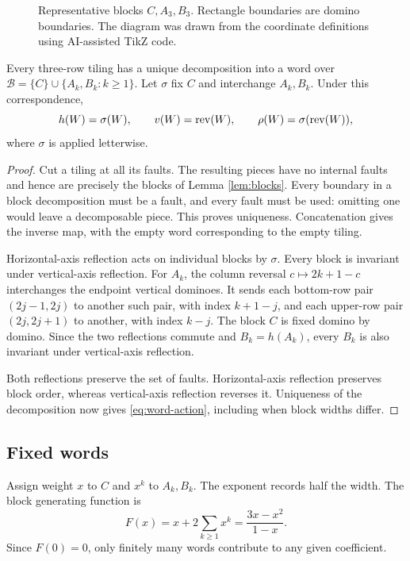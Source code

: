 \begin{figure}[htbp]
\centering

\caption{Representative blocks $C,A_3,B_3$. Rectangle boundaries
are domino boundaries. The diagram was drawn from the coordinate
definitions using AI-assisted TikZ code.}\label{fig:blocks}
\end{figure}

\begin{lemma}\label{lem:word}
Every three-row tiling has a unique decomposition into a word
over $\mathcal B=\{C\}\cup\{A_k,B_k:k\ge1\}$.
Let $\sigma$ fix $C$ and interchange $A_k,B_k$.
Under this correspondence,
\begin{equation}\label{eq:word-action}
 h(W)=\sigma(W),\qquad v(W)=\operatorname{rev}(W),\qquad
 \rho(W)=\sigma(\operatorname{rev}(W)),
\end{equation}
where $\sigma$ is applied letterwise.
\end{lemma}
\begin{proof}
Cut a tiling at all its faults. The resulting pieces have no
internal faults and hence are precisely the blocks of Lemma
\ref{lem:blocks}. Every boundary in a block decomposition must
be a fault, and every fault must be used: omitting one would
leave a decomposable piece. This proves uniqueness.
Concatenation gives the inverse map, with the empty word
corresponding to the empty tiling.

Horizontal-axis reflection acts on individual blocks by $\sigma$.
Every block is invariant under vertical-axis reflection.
For $A_k$, the column reversal $c\mapsto2k+1-c$ interchanges
the endpoint vertical dominoes. It sends each bottom-row pair
$(2j-1,2j)$ to another such pair, with index $k+1-j$,
and each upper-row pair $(2j,2j+1)$ to another, with index $k-j$.
The block $C$ is fixed domino by domino. Since the two
reflections commute and $B_k=h(A_k)$, every $B_k$ is also
invariant under vertical-axis reflection.

Both reflections preserve the set of faults. Horizontal-axis
reflection preserves block order, whereas vertical-axis
reflection reverses it. Uniqueness of the decomposition now
gives \eqref{eq:word-action}, including when block widths differ.
\end{proof}

\subsection{Fixed words}
Assign weight $x$ to $C$ and $x^k$ to $A_k,B_k$.
The exponent records half the width.
The block generating function is
\begin{equation}\label{eq:F}
 F(x)=x+2\sum_{k\ge1}x^k=\frac{3x-x^2}{1-x}.
\end{equation}
Since $F(0)=0$, only finitely many words contribute to any
given coefficient.

